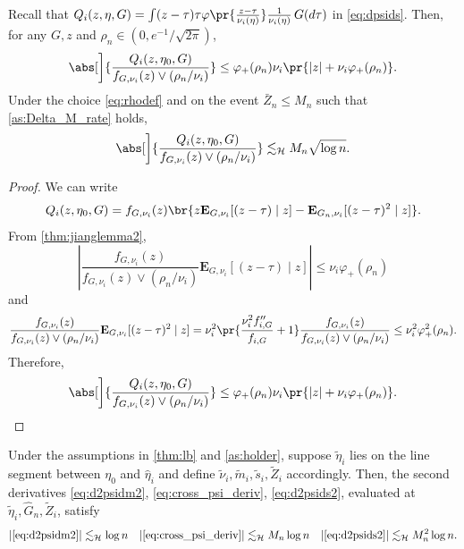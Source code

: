 \documentclass[12pt, reqno]{amsart}
\newcommand{\absauto}[1]{\left| #1 \right|}
\newcommand{\invphi}{\varphi_{+}}
\newcommand{\leH}{\lesssim_{\mathcal{H}}}
\newcommand{\hateta}{\hat\eta}
\newcommand{\PE}{\mathbf{E}}
\numberwithin{equation}{section}
\begin{document}
\begin{refsection}
\begin{appendices}
\begin{lemma}
\label{lemma:qbound} Recall that $Q_i(z, \eta, G) = \int (z-\tau)\tau \varphi\pr{\frac
 {z-\tau}{\nu_i(\eta)}} \frac{1}{\nu_i(\eta)} \, G(d\tau)$ in \eqref{eq:dpsids}. Then,
 for any $G, z$ and $\rho_n
\in (0,
e^{-1}/\sqrt{2\pi})$,
\begin{equation}
    \abs[\bigg]{ \frac{Q_i(z, \eta_0, G)}{f_{G, \nu_i}(z) \vee (\rho_n / \nu_i)} }
    \le
    \invphi(\rho_n) \nu_i \pr{|z| + \nu_i \invphi(\rho_n)}.
\label{eq:qbound}
\end{equation}
Under the choice \eqref{eq:rhodef} and on the event $\bar Z_n \le M_n$ such that 
\cref{as:Delta_M_rate} holds, \[
\abs[\bigg]{ \frac{Q_i(z, \eta_0, G)}{f_{G, \nu_i}(z) \vee (\rho_n / \nu_i)} } \leH M_n
\sqrt{\log n}.
\]
\end{lemma}
\begin{proof}
We can write \[
Q_i(z, \eta_0, G) = f_{G, \nu_i}(z) \br{z\PE_{G,
\nu_i}[(z-\tau) \mid z]  -\PE_{ G_n,
\nu_i} [(z-\tau)^2 \mid z]
}.
\]
From \cref{thm:jianglemma2}, \[
\absauto{\frac{f_{G, \nu_i}(z)}{f_{G, \nu_i}(z) \vee (\rho_n / \nu_i)}
\PE_{G, \nu_i}[(z-\tau) \mid z]} \le \nu_i \invphi(\rho_n)
\]
and \[
\frac{f_{ G, \nu_i }(z)}{f_{ G, \nu_i}(z) \vee (\rho_n / \nu_i)}
\PE_{ G, \nu_i} [(z-\tau)^2 \mid z]
= \nu_i^2 \pr{\frac{\nu_i^2 f_{i, G}''}{f_{i,
G}} + 1} \frac{f_{G, \nu_i}(z)}{f_{G, \nu_i}(z) \vee
(\rho_n / \nu_i)} \le \nu_i^2 \invphi^2(\rho_n).
\]
Therefore, \[
\abs[\bigg]{ \frac{Q_i(z, \eta_0, G)}{f_{G, \nu_i}(z) \vee (\rho_n /
\nu_i)} } \le \invphi(\rho_n) \nu_i \pr{ |z| + \nu_i \invphi(\rho_n)}. \qedhere
\]
\end{proof}


\begin{lemma}
\label{lemma:secondderivatives}
    Under the assumptions in \cref{thm:lb} and \cref{as:holder}, suppose $\tilde \eta_i$
    lies on the line segment between $\eta_0$ and $\hateta_i$ and define $\tilde
    \nu_i, \tilde m_i, \tilde s_i, \tilde Z_i$ accordingly. Then, the
    second
    derivatives \eqref{eq:d2psidm2}, \eqref{eq:cross_psi_deriv},
    \eqref{eq:d2psids2}, evaluated at $\tilde\eta_i, \hat G_n, \tilde Z_i$,
    satisfy
    \begin{align*}
    |\eqref{eq:d2psidm2}| \leH \log n  \quad 
    |\eqref{eq:cross_psi_deriv}| \leH M_n \log n \quad 
    |\eqref{eq:d2psids2}| \leH M_n^2 \log n.
    \end{align*}
\end{lemma}


\end{appendices}
\end{refsection}
\end{document}
